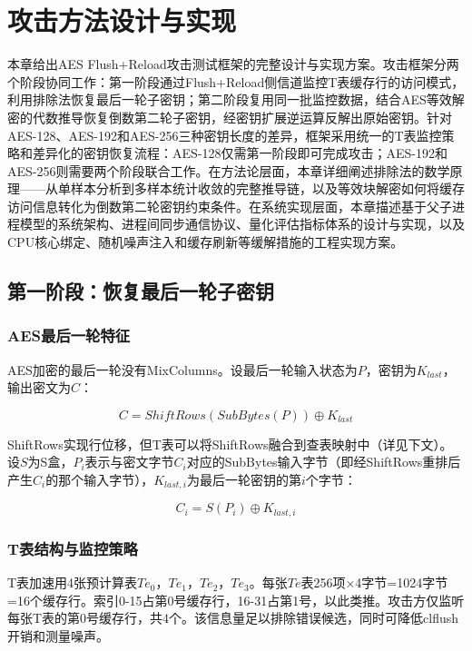 \chapter{攻击方法设计与实现}
\label{cha:method}

本章给出AES Flush+Reload攻击测试框架的完整设计与实现方案。攻击框架分两个阶段协同工作：第一阶段通过Flush+Reload侧信道监控T表缓存行的访问模式，利用排除法恢复最后一轮子密钥；第二阶段复用同一批监控数据，结合AES等效解密的代数推导恢复倒数第二轮子密钥，经密钥扩展逆运算反解出原始密钥。针对AES-128、AES-192和AES-256三种密钥长度的差异，框架采用统一的T表监控策略和差异化的密钥恢复流程：AES-128仅需第一阶段即可完成攻击；AES-192和AES-256则需要两个阶段联合工作。在方法论层面，本章详细阐述排除法的数学原理——从单样本分析到多样本统计收敛的完整推导链，以及等效块解密如何将缓存访问信息转化为倒数第二轮密钥约束条件。在系统实现层面，本章描述基于父子进程模型的系统架构、进程间同步通信协议、量化评估指标体系的设计与实现，以及CPU核心绑定、随机噪声注入和缓存刷新等缓解措施的工程实现方案。

\section{第一阶段：恢复最后一轮子密钥}

\subsection{AES最后一轮特征}

AES加密的最后一轮没有MixColumns。设最后一轮输入状态为$P$，密钥为$K_{last}$，输出密文为$C$：

\begin{equation}
C = ShiftRows(SubBytes(P)) \oplus K_{last}
\end{equation}

ShiftRows实现行位移，但T表可以将ShiftRows融合到查表映射中（详见下文）。设$S$为S盒，$P_i$表示与密文字节$C_i$对应的SubBytes输入字节（即经ShiftRows重排后产生$C_i$的那个输入字节），$K_{last,i}$为最后一轮密钥的第$i$个字节：

\begin{equation}
C_i = S(P_i) \oplus K_{last,i}
\end{equation}

\subsection{T表结构与监控策略}

T表加速用4张预计算表$Te_0$，$Te_1$，$Te_2$，$Te_3$。每张$Te$表256项×4字节=1024字节=16个缓存行。索引0-15占第0号缓存行，16-31占第1号，以此类推。攻击方仅监听每张T表的第0号缓存行，共4个。该信息量足以排除错误候选，同时可降低clflush开销和测量噪声。

